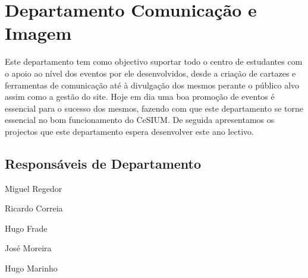 \section{Departamento Comunicação e Imagem}

\indent	Este departamento tem como objectivo suportar todo o centro de estudantes com o apoio ao nível dos eventos por ele desenvolvidos, desde a criação de cartazes e ferramentas de comunicação até à divulgação dos mesmos perante o público alvo assim como a gestão do site. Hoje em dia uma boa promoção de eventos é essencial para o sucesso dos mesmos, fazendo com que este departamento se torne essencial no bom funcionamento do CeSIUM. De seguida apresentamos os projectos que este departamento espera desenvolver este ano lectivo.

\subsection{Responsáveis de Departamento}
\begin{itemizedash}
  \item Miguel Regedor
  \item Ricardo Correia
  \item Hugo Frade
  \item José Moreira
  \item Hugo Marinho 
\end{itemizedash}
